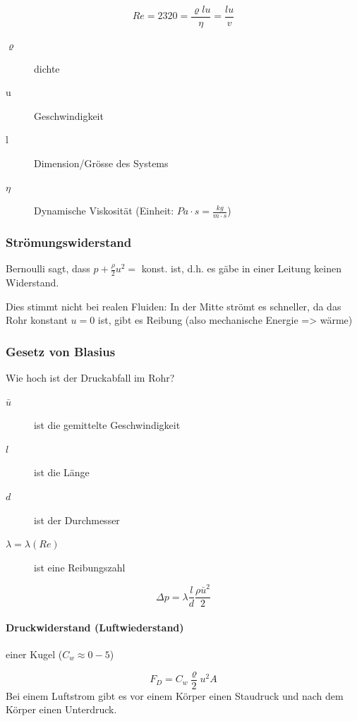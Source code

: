\documentclass[a4paper]{scrartcl}
\begin{document}
\[
	Re = 2320 = \frac{\varrho lu}{\eta} = \frac{lu}{v}
\]

\begin{description}
\item[$\varrho$] dichte
\item[u] Geschwindigkeit
\item[l] Dimension/Grösse des Systems
\item[$\eta$] Dynamische Viskosität (Einheit: $Pa \cdot s = \frac{kg}{m \cdot s}$)
\end{description}


\subsubsection{Strömungswiderstand}

Bernoulli sagt, dass $p + \frac{\rho}{2} u^2 =$ konst. ist, d.h. es gäbe in einer Leitung keinen Widerstand.

Dies stimmt nicht bei realen Fluiden: In der Mitte strömt es schneller, da das Rohr konstant $u=0$ ist, gibt es Reibung (also mechanische Energie => wärme)


\subsubsection{Gesetz von Blasius}

Wie hoch ist der Druckabfall im Rohr?

\begin{description}
	\item[$\bar{u}$] ist die gemittelte Geschwindigkeit
	\item[$l$] ist die Länge
	\item[$d$] ist der Durchmesser
	\item[$\lambda = \lambda(Re)$] ist eine Reibungszahl %
\end{description}

\[
	\Delta p = \lambda \frac{l}{d}\frac{\rho \bar{u}^2}{2}
\]






\paragraph{Druckwiderstand (Luftwiederstand)} einer Kugel ($C_w \approx 0-5$)

\[
	F_D = C_w \frac{\varrho}{2} u^2 A
\]
Bei einem Luftstrom gibt es vor einem Körper einen Staudruck und nach dem Körper einen Unterdruck.
\end{document}

